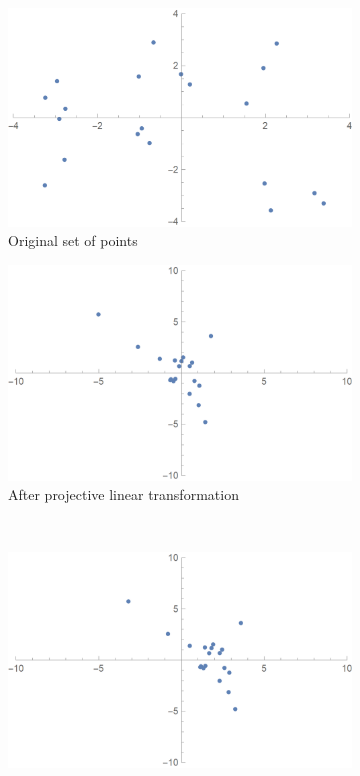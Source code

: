 \documentclass[11pt]{extarticle}
\begin{document}
    \begin{figure}[!ht]
        \begin{subfigure}{.5\textwidth}
            \centering
            \includegraphics[scale=.2]{ma1.png}
            \caption{Original set of points}
        \end{subfigure}
        \begin{subfigure}{.5\textwidth}
            \centering
            \includegraphics[scale=.2]{ma2.png}
            \caption{After projective linear transformation}
        \end{subfigure}
        \\
        \begin{subfigure}{1\textwidth}
            \centering
            \includegraphics[scale=.2]{ma3.png}

\end{subfigure}
\end{figure}
\end{document}
